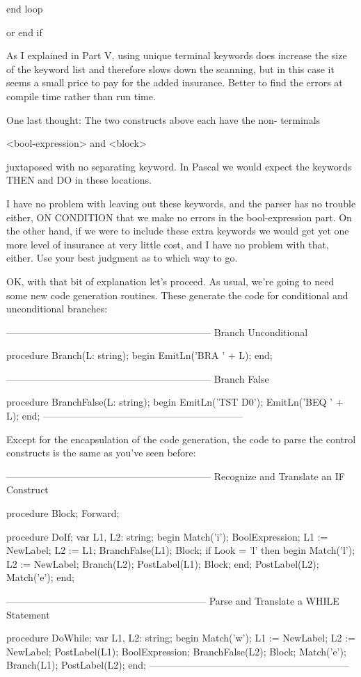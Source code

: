 \documentclass[float=false, crop=false]{standalone}
\begin{document}
     end { loop }

or   end { if }


As I explained in Part V, using unique terminal keywords does increase the size
of the keyword list and therefore slows down the scanning, but in this case it
seems a small price to pay for the added insurance. Better to find the errors at
compile time rather than run time.

One last thought: The two constructs above each have the non- terminals


      <bool-expression> and <block>


juxtaposed with no separating keyword. In Pascal we would expect the keywords
THEN and DO in these locations.

I have no problem with leaving out these keywords, and the parser has no trouble
either, ON CONDITION that we make no errors in the bool-expression part. On the
other hand, if we were to include these extra keywords we would get yet one more
level of insurance at very little cost, and I have no problem with that, either.
Use your best judgment as to which way to go.

OK, with that bit of explanation let's proceed. As usual, we're going to need
some new code generation routines. These generate the code for conditional and
unconditional branches:

\begin{code}
{---------------------------------------------------------------}
{ Branch Unconditional  }

procedure Branch(L: string);
begin
   EmitLn('BRA ' + L);
end;


{---------------------------------------------------------------}
{ Branch False }

procedure BranchFalse(L: string);
begin
   EmitLn('TST D0');
   EmitLn('BEQ ' + L);
end;
{--------------------------------------------------------------}
\end{code}

Except for the encapsulation of the code generation, the code to parse the
control constructs is the same as you've seen before:

\begin{code}
{---------------------------------------------------------------}
{ Recognize and Translate an IF Construct }

procedure Block; Forward;


procedure DoIf;
var L1, L2: string;
begin
   Match('i');
   BoolExpression;
   L1 := NewLabel;
   L2 := L1;
   BranchFalse(L1);
   Block;
   if Look = 'l' then begin
      Match('l');
      L2 := NewLabel;
      Branch(L2);
      PostLabel(L1);
      Block;
   end;
   PostLabel(L2);
   Match('e');
end;


{--------------------------------------------------------------}
{ Parse and Translate a WHILE Statement }

procedure DoWhile;
var L1, L2: string;
begin
   Match('w');
   L1 := NewLabel;
   L2 := NewLabel;
   PostLabel(L1);
   BoolExpression;
   BranchFalse(L2);
   Block;
   Match('e');
   Branch(L1);
   PostLabel(L2);
end;
{--------------------------------------------------------------}
\end{code}
\end{document}
